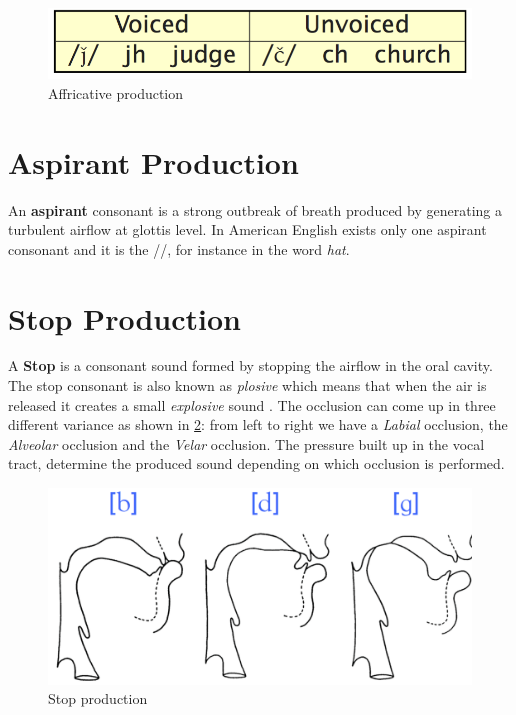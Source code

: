 \begin{figure}[!ht]
    \centering
    \includegraphics[scale=0.5]{Figures/affricative_production.png}
    \caption{Affricative production \cite{mit_phonetics}}
    \label{fig:affricate_prod}
\end{figure}


\section{Aspirant Production}
\label{sec:Aspirant Production}
An \textbf{aspirant} consonant is a strong outbreak of breath produced by generating a turbulent airflow at glottis level. In American English exists only one aspirant consonant and it is the //, for instance in the word \textit{hat}.


\section{Stop Production}
\label{sec:Stop Producton}
A \textbf{Stop} is a consonant sound formed by stopping the airflow in the oral cavity. The stop consonant is also known as \textit{plosive} which means that when the air is released it creates a small \textit{explosive} sound \cite{stop_consonants}. The occlusion can come up in three different variance as shown in \ref{fig:stop_prod}: from left to right we have a \textit{Labial} occlusion, the \textit{Alveolar} occlusion and the \textit{Velar} occlusion. The pressure built up in the vocal tract, determine the produced sound depending on which occlusion is performed.

\begin{figure}[!ht]
    \centering
    \includegraphics[scale=0.5]{Figures/stop_production.png}
    \caption{Stop production \cite{mit_phonetics}}
    \label{fig:stop_prod}
\end{figure}

